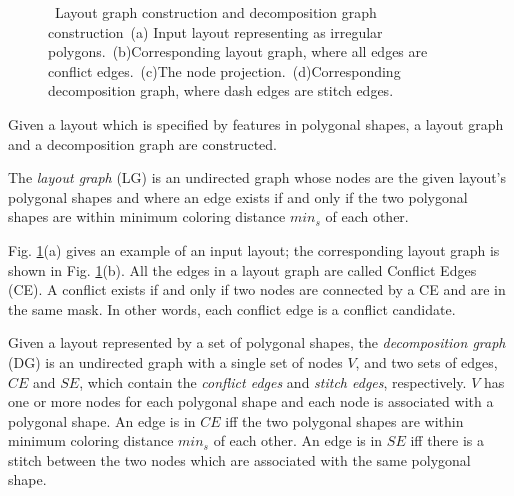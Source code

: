 \documentclass[10pt,conference]{IEEEtran}
\begin{document}
\begin{figure}[bt]
	\centering
	\hspace{.1em}
	\caption{~Layout graph construction and decomposition graph construction~(a) Input layout representing as irregular polygons.~(b)Corresponding layout graph, where all edges are conflict edges.~(c)The node projection.~(d)Corresponding decomposition graph, where dash edges are stitch edges.}
\label{fig:input}
\end{figure}


Given a layout which is specified by features in polygonal shapes, a layout graph \cite{DPL_ICCAD08_Kahng} and a decomposition graph \cite{DPL_ICCAD2010_Yuan}  are constructed.




\begin{define}
The \textit{ layout graph} (LG) is an undirected graph whose nodes are the given layout's polygonal shapes and where an edge exists if and only if the two polygonal shapes are within minimum coloring distance $min_s$ of each other.
\end{define}

Fig. \ref{fig:input}(a) gives an example of an input layout; the corresponding layout graph is shown in Fig. \ref{fig:input}(b).
All the edges in a layout graph are called Conflict Edges (CE).
A conflict exists if and only if two nodes are connected by a CE and are in the same mask.
In other words, each conflict edge is a conflict candidate.



\begin{define}
Given a layout represented by a set of polygonal shapes, the \textit{decomposition graph} (DG) is an undirected graph with a single set of nodes $V$, and two sets of edges, $CE$ and $SE$, which contain the \textit{conflict edges} and \textit{stitch edges}, respectively.
$V$ has one or more nodes for each polygonal shape and each node is associated with a polygonal shape.
An edge is in $CE$ iff the two polygonal shapes are within minimum coloring distance $min_s$ of each other.
An edge is in $SE$ iff there is a stitch between the two nodes which are associated with the same polygonal shape.
\end{define}
\end{document}
